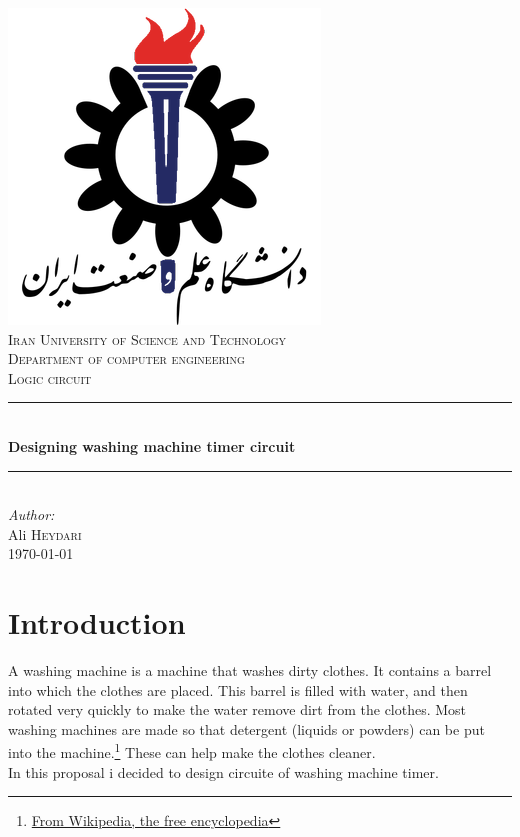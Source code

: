 \documentclass[12pt]{article}
\begin{document}
\begin{titlepage}

\newcommand{\HRule}{\rule{\linewidth}{0.5mm}}

\center

\includegraphics[scale=0.3]{IUST_logo_color}\\[1cm]
\textsc{\Large Iran University of Science and Technology}\\[1.5cm]
\textsc{\large Department of computer engineering}\\[0.5cm]
\textsc{Logic circuit}\\[0.5cm]



\HRule \\[0.4cm]
{ \huge \bfseries Designing washing machine timer circuit}\\[0.4cm]
\HRule \\[1.5cm]

\Large \emph{Author:}\\
Ali \textsc{Heydari}\\[3cm]

{\large \today}\\[2cm]

\vfill

\end{titlepage}



\section{Introduction}

A washing machine is a machine that washes dirty clothes. It contains a barrel into which the clothes are placed. This barrel is filled with water, and then rotated very quickly to make the water remove dirt from the clothes. Most washing machines are made so that detergent (liquids or powders) can be put into the machine.\footnote{\href{https://simple.wikipedia.org/wiki/Washing_machine}{From Wikipedia, the free encyclopedia}} These can help make the clothes cleaner.
\\ In this proposal i decided to design circuite of washing machine timer.
\end{document}
